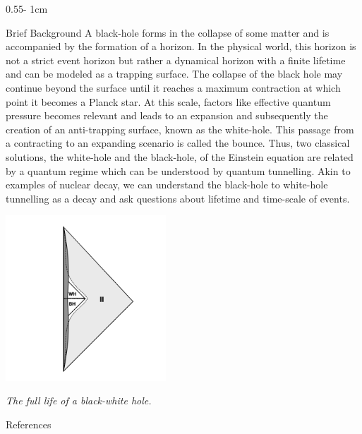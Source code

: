 \documentclass{../psuposter}
\begin{document}
\begin{frame}
\begin{columns}[t, totalwidth=\textwidth]
\begin{column}{0.55\textwidth - 1cm}
    \begin{block}{Brief Background}
    	A black-hole forms in the collapse of some matter and is accompanied by the formation of a horizon. In the physical world, this horizon is not a strict event horizon but rather a dynamical horizon with a finite lifetime and can be modeled as a trapping surface. The collapse of the black hole may continue beyond the surface until it reaches a maximum contraction at which point it becomes a Planck star. At this scale, factors like effective quantum pressure becomes relevant and leads to an expansion and subsequently the creation of an anti-trapping surface, known as the white-hole. This passage from a contracting to an expanding scenario is called the bounce. Thus, two classical solutions, the white-hole and the black-hole, of the Einstein equation are related by a quantum regime which can be understood by quantum tunnelling. Akin to examples of nuclear decay, we can understand the black-hole to white-hole tunnelling as a decay and ask questions about lifetime and time-scale of events. \cite{rovelliSmallBlackWhite2018}     
        \begin{center}
		   	\includegraphics[width=0.45\textwidth]{images/background}    		

    	\textit{The full life of a black-white hole.\cite{rovelliWhiteholeDarkMatter2018} } 
    	\end{center}
    \end{block}


    \begin{block}{References}
    \nocite{*}
        
%        
		
    \end{block}


\end{column}
\end{columns}
\end{frame}
\end{document}
